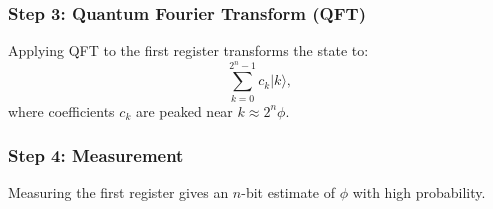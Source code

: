 \documentclass{beamer}
\begin{document}
\begin{frame}
\frametitle{Step 3: Quantum Fourier Transform (QFT)}

\begin{block}{}
Applying QFT to the first register transforms the state to:
\[
    \sum_{k=0}^{2^n -1} c_k \vert k \rangle ,
\]
where coefficients $c_k$ are peaked near $k \approx 2^n \phi$.

\end{block}
\end{frame}

\begin{frame}
\frametitle{Step 4: Measurement}

\begin{block}{}
Measuring the first register gives an $n$-bit estimate of $\phi$ with high probability.
\end{block}
\end{frame}
\end{document}
